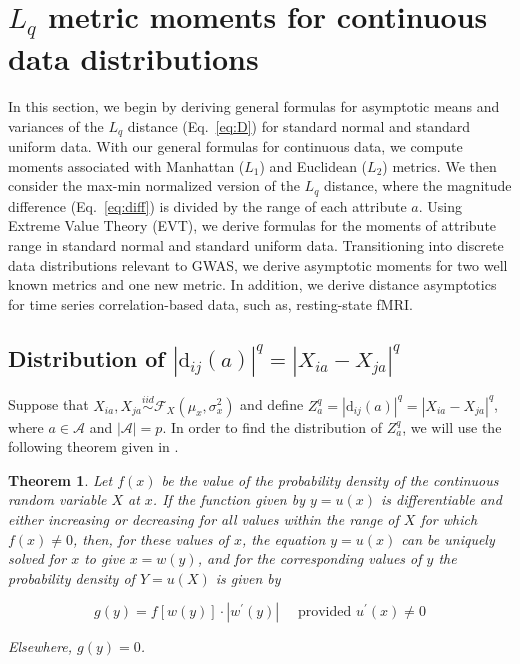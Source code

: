 \documentclass[10pt,letterpaper]{article}
\newtheorem{theorem}{Theorem}[section]
\begin{document}
\section*{\texorpdfstring{$L_q$}{} metric moments for continuous data distributions}\label{sec:moment_derivations}

In this section, we begin by deriving general formulas for asymptotic means and variances of the $L_q$ distance (Eq.~\ref{eq:D}) for standard normal and standard uniform data. With our general formulas for continuous data, we compute moments associated with Manhattan ($L_1$) and Euclidean ($L_2$) metrics. We then consider the max-min normalized version of the $L_q$ distance, where the magnitude difference (Eq.~\ref{eq:diff}) is divided by the range of each attribute $a$. Using Extreme Value Theory (EVT), we derive formulas for the moments of attribute range in standard normal and standard uniform data. Transitioning into discrete data distributions relevant to GWAS, we derive asymptotic moments for two well known metrics and one new metric. In addition, we derive distance asymptotics for time series correlation-based data, such as, resting-state fMRI.  

\subsection*{Distribution of \texorpdfstring{$|\text{d}_{ij}(a)|^q = |X_{ia} - X_{ja}|^q$}{}}

Suppose that $X_{ia}, X_{ja} \overset{iid}{\sim} \mathcal{F}_X(\mu_x,\sigma^2_x)$ and define $Z^q_a = |\text{d}_{ij}(a)|^q = |X_{ia} - X_{ja}|^q$, where $a \in \mathcal{A}$ and $|\mathcal{A}| = p$. In order to find the distribution of $Z^q_a$, we will use the following theorem given in \cite{freund2004}.

\begin{theorem}\label{thm:freund}
	Let $f(x)$ be the value of the probability density of the continuous random variable $X$ at $x$. If the function given by $y = u(x)$ is differentiable and either increasing or decreasing for all values within the range of $X$ for which $f(x) \neq 0$, then, for these values of $x$, the equation $y = u(x)$ can be uniquely solved for $x$ to give $x = w(y)$, and for the corresponding values of $y$ the probability density of $Y = u(X)$ is given by
	
	\[g(y) = f[w(y)] \cdot |w^\prime(y)| \quad \text{ provided } u^\prime(x) \neq 0\]
	
	\noindent Elsewhere, $g(y) = 0$.
\end{theorem}
\end{document}
